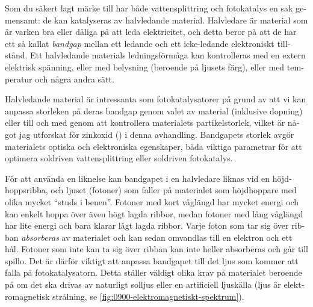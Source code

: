 \documentclass[draft,webedition,openright,titles,swedish,english]{LuaUUThesis}\usepackage[]{graphicx}\usepackage[]{xcolor}
\begin{document}
\begin{otherlanguage}{swedish}
Som du säkert lagt märke till har både vattensplittring och fotokatalys
en sak gemensamt: de kan katalyseras av halvledande material.
Halvledare är material som är varken bra eller dåliga på att leda
elektricitet, och detta beror på att de har ett så kallat \emph{bandgap}
mellan ett ledande och ett icke-ledande elektroniskt tillstånd.
Ett halvledande materials ledningsförmåga kan kontrolleras med en extern
elektrisk spänning, eller med belysning (beroende på ljusets färg), eller
med temperatur och några andra sätt.

Halvledande material är intressanta som fotokatalysatorer på grund av att vi kan
anpassa storleken på deras bandgap genom valet av material (inklusive dopning)
eller till och med genom att kontrollera materialets partikelstorlek, vilket är
något jag utforskat för zinkoxid (\ZnO) i denna avhandling.
Bandgapets storlek avgör materialets optiska och elektroniska egenskaper, båda
viktiga parametrar för att optimera soldriven vattensplittring
eller soldriven fotokatalys.

För att använda en liknelse kan bandgapet i en halvledare liknas vid en höjdhoppsribba,
och ljuset (fotoner) som faller på materialet som höjdhoppare med olika mycket \enquote{studs i benen}.
Fotoner med kort våglängd har mycket energi och kan enkelt hoppa över även högt lagda ribbor,
medan fotoner med lång våglängd har lite energi och bara klarar lågt lagda ribbor.
Varje foton som tar sig över ribban \emph{absorberas} av materialet och kan sedan
omvandlas till en elektron och ett hål.
Fotoner som inte kan ta sig över ribban kan inte heller absorberas och går till spillo.
Det är därför viktigt att anpassa bandgapet till det ljus som kommer att falla
på fotokatalysatorn. Detta ställer väldigt olika krav på materialet beroende
på om det ska drivas av naturligt solljus eller en artificiell ljuskälla
(ljus är elektromagnetisk strålning, se \cref{fig:0900-elektromagnetiskt-spektrum}).

%


\begin{figure}[tbp]
\centering


%


\end{figure}
\end{otherlanguage}
\end{document}
